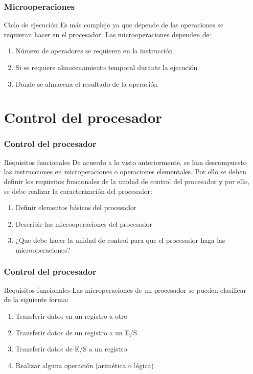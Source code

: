 \documentclass{beamer}
\begin{document}
\begin{frame}
	\frametitle{Microoperaciones}
	\begin{block}{Ciclo de ejecución}
	Es más complejo ya que depende de las operaciones se requieran hacer en el procesador. Las microoperaciones dependen de:
	\begin{enumerate}
		\item Número de operadores se requieren en la instrucción
		\item Si se requiere almacenamiento temporal durante la ejecución
		\item Donde se almacena el resultado de la operación	
	\end{enumerate}	 
	\end{block}
\end{frame}



\section{Control del procesador}

\begin{frame}
	\frametitle{Control del procesador}
	\begin{block}{Requisitos funcionales}
	De acuerdo a lo visto anteriormente, se han descompuesto las instrucciones en microperaciones o operaciones elementales. Por ello se deben definir los requisitos funcionales de la unidad de control del procesador y por ello, se debe realizar la caracterización del procesador:
	\begin{enumerate}
		\item Definir elementos básicos del procesador
		\item Describir las microoperaciones del procesador
		\item ¿Que debe hacer la unidad de control para que el procesador haga las microoperaciones?
	\end{enumerate}	 
	\end{block}
\end{frame}

\begin{frame}
	\frametitle{Control del procesador}
	\begin{block}{Requisitos funcionales}
	Las microperaciones de un procesador se pueden clasificar de la siguiente forma:
	\begin{enumerate}
		\item Transferir datos en un registro a otro
		\item Transferir datos de un registro a un E/S
		\item Transferir datos de E/S a un registro
		\item Realizar alguna operación (arimética o lógica)
	\end{enumerate}	 
	\end{block}
\end{frame}
\end{document}
